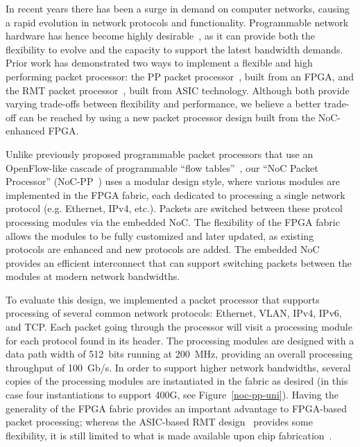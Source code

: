 


In recent years there has been a surge in demand on computer networks, causing a rapid evolution in network protocols and functionality.
Programmable network hardware has hence become highly desirable~\cite{nunes2014survey,mckeown2008openflow}, as it can provide both the flexibility to evolve and the capacity to support the latest bandwidth demands.
Prior work has demonstrated two ways to implement a flexible and high performing packet processor: the PP packet processor~\cite{attig2011400}, built from an FPGA, and the RMT packet processor~\cite{bosshart2013forwarding}, built from ASIC technology.
Although both provide varying trade-offs between flexibility and performance, we believe a better trade-off can be reached by using a new packet processor design built from the NoC-enhanced FPGA.

Unlike previously proposed programmable packet processors that use an OpenFlow-like cascade of programmable ``flow tables''~\cite{mckeown2008openflow}, our ``NoC Packet Processor'' (NoC-PP~\cite{bitar2015bringing}) uses a modular design style, where various modules are implemented in the FPGA fabric, each dedicated to processing a single network protocol (e.g. Ethernet, IPv4, etc.).
Packets are switched between these protcol processing modules via the embedded NoC.
The flexibility of the FPGA fabric allows the modules to be fully customized and later updated, as existing protocols are enhanced and new protocols are added.
The embedded NoC provides an efficient interconnect that can support switching packets between the modules at modern network bandwidths.

To evaluate this design, we implemented a packet processor that supports processing of several common network protocols: Ethernet, VLAN, IPv4, IPv6, and TCP.
Each packet going through the processor will visit a processing module for each protocol found in its header.
The processing modules are designed with a data path width of 512~bits running at 200~MHz, providing an overall processing throughput of 100~Gb/s.
In order to support higher network bandwidths, several copies of the processing modules are instantiated in the fabric as desired (in this case four instantiations to support 400G, see Figure~\ref{noc-pp-uni}).
Having the generality of the FPGA fabric provides an important advantage to FPGA-based packet processing; whereas the ASIC-based RMT design~\cite{bosshart2013forwarding} provides some flexibility, it is still limited to what is made available upon chip fabrication~\cite{bitar2015bringing}.

